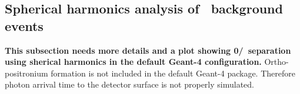 \begin{comment}
The effects due to the presence of scintillation light and applying the default QE are shown in Fig.~\ref{fig:SL_topologies_all}. Spherical harmonics of the same three representative event topologies are now calculated using early light (photons with arrival time less than 33.5~ns) that contains both directional Cherenkov light and uniform scintillation light. The of number PE seen by each tube is reduced by the default QE. In this more realistic scenario, the higher order multiple moments, S2 and S3, no longer provide noticeable separation between different event topologies.


\begin{figure*}[h]
  \centering
  \texttt{[image: hS0vsS1\_topologies\_allLight\_VtxSmear0cm\_VtxShiftX0cm\_33p5ns\_center.pdf]}
  \texttt{[image: hS2vsS3\_topologies\_allLight\_VtxSmear0cm\_VtxShiftX0cm\_33p5ns\_center.pdf]}
  \texttt{[image: hS01\_topologies\_allLight\_VtxSmear0cm\_VtxShiftX0cm\_33p5ns\_center.pdf]}
  \caption{Spherical harmonics for three event topologies: two
    back-to-back 1.26~MeV electrons (\emph{black squares and black
      dotted line}), two 1.26~MeV electrons at 90$^{\circ}$ angle
    (\emph{blue triangles and blue dashed line}), and a single
    2.529~MeV electron representing $^{8}$B background (\emph{red
      crosses and red solid line}). Simulation of 1000 events
    originated at the center of the sphere. Separation between
    Cherenkov and scintillation light is implemented 33.5~ns cut on
    the photon arrival time. Perfect vertex reconstruction - true
    vertex position is used. \emph{Top left:} $S_0$ versus $S_1$
    scatter plot. Black dotted line is a linear fit of the
    90$^{\circ}$ topology and $^{8}$B events. Variable $S_{01}$ is
    defined as a projection of 2D distribution onto this linear
    fit. \emph{Top right:} $S_2$ versus $S_3$ scatter
    plot. \emph{Bottom:} $S_{01}$ distributions for the three
    topologies. These distributions are normalized to unit area for
    shape comparison}
\label{fig:SL_topologies_all}
\end{figure*}


\endgroup
\end{comment}


\subsection{Spherical harmonics analysis of \C~background events}
\label{subsec:c10_spherical_harmonics}
\textbf{This subsection needs more details and a plot showing 0\nbb/\C~separation using sherical harmonics in the default Geant-4 configuration.}
Ortho-positronium formation is not included in the default Geant-4 package. Therefore photon arrival time to the detector surface is not 
properly simulated.
